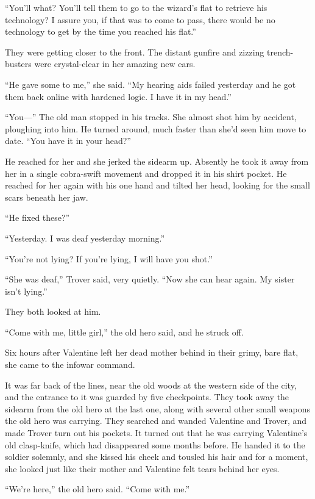 “You’ll what? You’ll tell them to go to the wizard’s flat to
retrieve his technology? I assure you, if that was to come to pass,
there would be no technology to get by the time you reached his
flat.”

They were getting closer to the front. The distant gunfire and
zizzing trench-busters were crystal-clear in her amazing new ears.

“He gave some to me,” she said. “My hearing aids failed yesterday
and he got them back online with hardened logic. I have it in my
head.”

“You---” The old man stopped in his tracks. She almost shot him by
accident, ploughing into him. He turned around, much faster than
she’d seen him move to date. “You have it in your head?”

He reached for her and she jerked the sidearm up. Absently he took
it away from her in a single cobra-swift movement and dropped it in
his shirt pocket. He reached for her again with his one hand and
tilted her head, looking for the small scars beneath her jaw.

“He fixed these?”

“Yesterday. I was deaf yesterday morning.”

“You’re not lying? If you’re lying, I will have you shot.”

“She was deaf,” Trover said, very quietly. “Now she can hear again.
My sister isn’t lying.”

They both looked at him.

“Come with me, little girl,” the old hero said, and he struck off.

\tb

Six hours after Valentine left her dead mother behind in their
grimy, bare flat, she came to the infowar command.

It was far back of the lines, near the old woods at the western
side of the city, and the entrance to it was guarded by five
checkpoints. They took away the sidearm from the old hero at the
last one, along with several other small weapons the old hero was
carrying. They searched and wanded Valentine and Trover, and made
Trover turn out his pockets. It turned out that he was carrying
Va\-len\-tine’s old clasp-knife, which had disappeared some months
before. He handed it to the soldier solemnly, and she kissed his
cheek and tousled his hair and for a moment, she looked just like
their mother and Valentine felt tears behind her eyes.

“We’re here,” the old hero said. “Come with me.”


